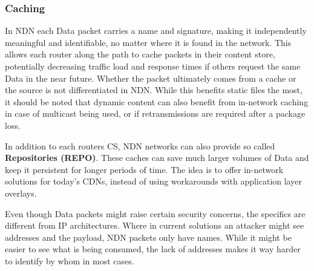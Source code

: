 \subsubsection{Caching}

In NDN each Data packet carries a name and signature, making it independently meaningful and identifiable, no matter where it is found in the network. This allows each router along the path to cache packets in their content store, potentially decreasing traffic load and response times if others request the same Data in the near future. Whether the packet ultimately comes from a cache or the source is not differentiated in NDN. While this benefits static files the most, it should be noted that dynamic content can also benefit from in-network caching in case of multicast being used, or if retransmissions are required after a package loss. 

In addition to each routers CS, NDN networks can also provide so called \textbf{Repositories (REPO)}. These caches can save much larger volumes of Data and keep it persistent for longer periods of time. The idea is to offer in-network solutions for today's CDNs, instead of using workarounds with application layer overlays.

Even though Data packets might raise certain security concerns, the specifics are different from IP architectures. Where in current solutions an attacker might see addresses and the payload, NDN packets only have names. While it might be easier to see what is being consumed, the lack of addresses makes it way harder to identify by whom in most cases. \cite{ZABJ14}

